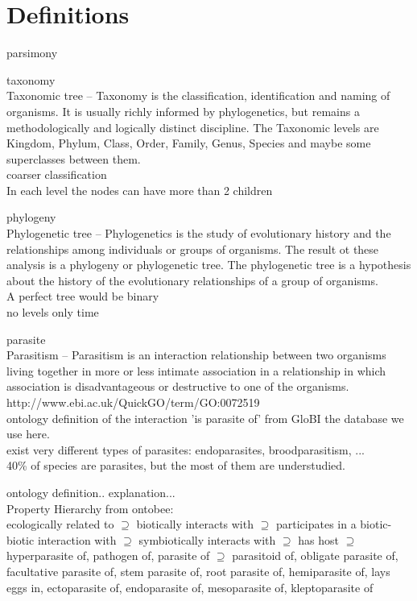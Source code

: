   \section{Definitions}
    \begin{definition} parsimony \cite{Cunningham1998}
    \end{definition}
    \begin{definition} taxonomy \\
      Taxonomic tree – Taxonomy is the classification, identification and naming of organisms. It is 
        usually richly informed by phylogenetics, but remains a methodologically and logically 
        distinct discipline. The Taxonomic levels are Kingdom, Phylum, Class, Order, Family, Genus, 
        Species and maybe some superclasses between them. \\
      coarser classification \\
      In each level the nodes can have more than 2 children
    \end{definition}
    \begin{definition} phylogeny \\
      Phylogenetic tree – Phylogenetics is the study of evolutionary history and the relationships 
        among individuals or groups of organisms. The result ot these analysis is a  phylogeny or 
        phylogenetic tree. The phylogenetic tree is a hypothesis about the history of the evolutionary 
        relationships of a group of organisms. \\
      A perfect tree would be binary \\
      no levels only time
    \end{definition}
    \begin{definition} parasite \\
      Parasitism – Parasitism is an interaction relationship between two organisms living together in 
        more or less intimate association in a relationship in which association is disadvantageous or 
        destructive to one of the organisms. \\
      http://www.ebi.ac.uk/QuickGO/term/GO:0072519 \\
      ontology definition of the interaction 'is parasite of' from GloBI the database we use here. \\
      exist very different types of parasites: endoparasites, broodparasitism, ... \\
      40\% of species are parasites, but the most of them are understudied. \cite{Windsor1998}
      
      ontology definition.. explanation... \\
      Property Hierarchy from ontobee: \\
      ecologically related to $\supseteq$ biotically interacts with $\supseteq$ participates in a 
        biotic-biotic interaction with $\supseteq$ symbiotically interacts with $\supseteq$ has host 
        $\supseteq$ hyperparasite of, pathogen of, parasite of $\supseteq$ parasitoid of, obligate 
        parasite of, facultative parasite of, stem parasite of, root parasite of, hemiparasite of, 
        lays eggs in, ectoparasite of, endoparasite of, mesoparasite of, kleptoparasite of
    \end{definition}

